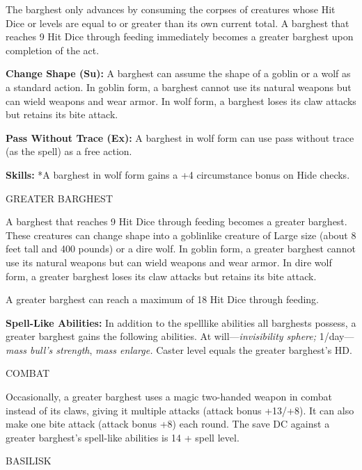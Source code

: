 \documentclass{article}
\begin{document}
The barghest only advances by consuming the corpses of creatures whose Hit Dice 
or levels are equal to or greater than its own current total. A barghest that reaches 
9 Hit Dice through feeding immediately becomes a greater barghest upon completion 
of the act.

\textbf{Change Shape (Su):} A barghest can assume the shape of a goblin or a wolf 
as a standard action. In goblin form, a barghest cannot use its natural weapons 
but can wield weapons and wear armor. In wolf form, a barghest loses its claw attacks 
but retains its bite attack.

\textbf{Pass Without Trace (Ex):} A barghest in wolf form can use pass without 
trace (as the spell) as a free action.

\textbf{Skills:} *A barghest in wolf form gains a +4 circumstance bonus on Hide 
checks.

\vspace{12pt}
GREATER BARGHEST

A barghest that reaches 9 Hit Dice through feeding becomes a greater barghest. 
These creatures can change shape into a goblinlike creature of Large size (about 
8 feet tall and 400 pounds) or a dire wolf. In goblin form, a greater barghest 
cannot use its natural weapons but can wield weapons and wear armor. In dire wolf 
form, a greater barghest loses its claw attacks but retains its bite attack.

A greater barghest can reach a maximum of 18 Hit Dice through feeding.

\textbf{Spell-Like Abilities:} In addition to the spelllike abilities all barghests 
possess, a greater barghest gains the following abilities. At will---\textit{invisibility 
sphere; }1/day---\textit{mass bull's strength}, \textit{mass enlarge. }Caster level 
equals the greater barghest's HD.

COMBAT

Occasionally, a greater barghest uses a magic two-handed weapon in combat instead 
of its claws, giving it multiple attacks (attack bonus +13/+8). It can also make 
one bite attack (attack bonus +8) each round. The save DC against a greater barghest's 
spell-like abilities is 14 + spell level.

\vspace{12pt}
{\LARGE{}BASILISK}
\end{document}
